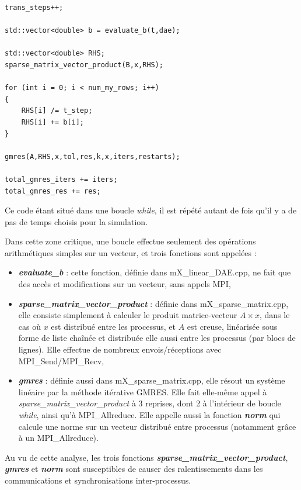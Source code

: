 \documentclass[11pt,a4paper,oneside]{memoir}
\theoremstyle{definition}
\theoremstyle{remark}
\theoremstyle{plain}
\begin{document}
\begin{lstlisting}
trans_steps++;

std::vector<double> b = evaluate_b(t,dae);

std::vector<double> RHS;
sparse_matrix_vector_product(B,x,RHS);

for (int i = 0; i < num_my_rows; i++)
{
	RHS[i] /= t_step;
	RHS[i] += b[i];
}

gmres(A,RHS,x,tol,res,k,x,iters,restarts);

total_gmres_iters += iters;
total_gmres_res += res;
\end{lstlisting}

Ce code étant situé dans une boucle \textit{while}, il est répété autant de fois qu'il y a de pas de temps choisis pour la simulation.

Dans cette zone critique, une boucle effectue seulement des opérations arithmétiques simples sur un vecteur, et trois fonctions sont appelées :
\begin{itemize}
\item \textbf{\textit{evaluate\_b}} : cette fonction, définie dans mX\_linear\_DAE.cpp, ne fait que des accès et modifications sur un vecteur, sans appels MPI,
\item \textbf{\textit{sparse\_matrix\_vector\_product}} : définie dans mX\_sparse\_matrix.cpp, elle consiste simplement à calculer le produit matrice-vecteur $A\times x$, dans le cas où $x$ est distribué entre les processus, et $A$ est creuse, linéarisée sous forme de liste chaînée et distribuée elle aussi entre les processus (par blocs de lignes). Elle effectue de nombreux envois/réceptions avec MPI\_Send/MPI\_Recv,
\item \textbf{\textit{gmres}} : définie aussi dans mX\_sparse\_matrix.cpp, elle résout un système linéaire par la méthode itérative GMRES. Elle fait elle-même appel à \textit{sparse\_matrix\_vector\_product} à 3 reprises, dont 2 à l'intérieur de boucle \textit{while}, ainsi qu'à MPI\_Allreduce. Elle appelle aussi la fonction \textbf{\textit{norm}} qui calcule une norme sur un vecteur distribué entre processus (notamment grâce à un MPI\_Allreduce).
\end{itemize}

Au vu de cette analyse, les trois fonctions \textbf{\textit{sparse\_matrix\_vector\_product}}, \textbf{\textit{gmres}} et \textbf{\textit{norm}} sont susceptibles de causer des ralentissements dans les communications et synchronisations inter-processus.
\end{document}
